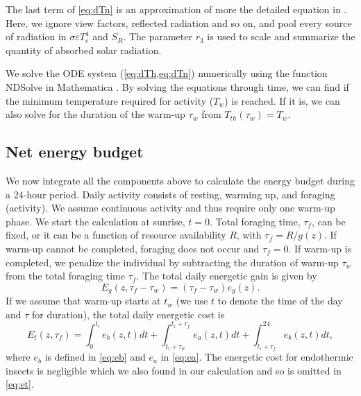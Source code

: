 The last term of \cref{eq:dTn}  is an approximation of more the detailed equation in \citet{Campbell2012}.
Here, we ignore view factors, reflected radiation and so on, and pool every source of radiation in $ \sigma \varepsilon T_e^4$ and $S_R$. 
The parameter $r_3$ is used to scale and summarize the quantity of absorbed solar radiation.

We solve the ODE system (\cref{eq:dTh,eq:dTn}) numerically using the function NDSolve in Mathematica \nocite{Mathematica10}.
By solving the equations through time, we can find if the minimum temperature  required for activity ($T_w$) is reached. %
If it is, we can also solve for the duration of the warm-up $\tau_w$ from $T_{th}(\tau_w) = T_w$. %


\subsection*{Net energy budget}
We now integrate all the components above to calculate  the energy budget during a 24-hour period.
Daily activity consists of resting, warming up, and foraging (activity).
We assume continuous activity and thus require only one warm-up phase.
We start the calculation at sunrise, $t = 0$.
Total foraging time, $\tau_f$, can be fixed, or it can be a function of resource availability $R$, with $\tau_f = R/g(z)$.
If warm-up cannot be completed, foraging does not occur and $\tau_f = 0$.
If warm-up is completed, we penalize the individual by subtracting the duration of warm-up $\tau_w$ from the total foraging time $\tau_f$. 
The total daily energetic gain is given by
\[
	E_g(z,\tau_f - \tau_w) = (\tau_f - \tau_w) e_g(z).
\]
%
If we assume that warm-up starts at $t_w$ (we use $t$ to denote the time of the day and $\tau$ for duration), the total daily  energetic cost is
\begin{equation} \label{eq:et}
	E_t(z, \tau_f) = \int_0^{t_i} e_b(z, t) dt + \int_{t_i + \tau_w}^{t_i + \tau_f } e_a(z,t) dt + \int_{t_i+\tau_f}^{24} e_b(z, t) dt,
\end{equation}
where $e_b$ is defined in \cref{eq:eb}  and $e_a$ in \cref{eq:ea}.
The energetic cost for endothermic insects is negligible \citep{Heinrich1975} which we also found in our calculation and so is omitted in \cref{eq:et}.  %

